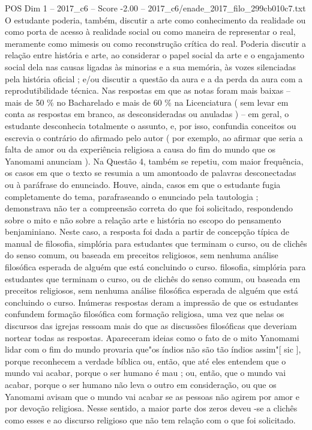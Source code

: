 \begin{textsample}{POS Dim 1 – 2017\_c6 – Score -2.00 – 2017\_c6/enade\_2017\_filo\_299cb010c7.txt}
O estudante poderia, também, discutir a arte como conhecimento da realidade ou como porta de acesso à realidade social ou como maneira de representar o real, meramente como mimesis ou como reconstrução crítica do real.
Poderia discutir a relação entre história e arte, ao considerar o papel social da arte e o engajamento social dela nas causas ligadas às minorias e a sua memória, às vozes silenciadas pela história oficial ; e/ou discutir a questão da aura e a da perda da aura com a reprodutibilidade técnica.
Nas respostas em que as notas foram mais baixas – mais de 50 \% no Bacharelado e mais de 60 \% na Licenciatura ( sem levar em conta as respostas em branco, as desconsideradas ou anuladas ) – em geral, o estudante desconhecia totalmente o assunto, e, por isso, confundia conceitos ou escrevia o contrário do afirmado pelo autor ( por exemplo, ao afirmar que seria a falta de amor ou da experiência religiosa a causa do fim do mundo que os Yanomami anunciam ).
Na Questão 4, também se repetiu, com maior frequência, os casos em que o texto se resumia a um amontoado de palavras desconectadas ou à paráfrase do enunciado.
Houve, ainda, casos em que o estudante fugia completamente do tema, parafraseando o enunciado pela tautologia ; demonstrava não ter a compreensão correta do que foi solicitado, respondendo sobre o mito e não sobre a relação arte e história no escopo do pensamento benjaminiano.
Neste caso, a resposta foi dada a partir de concepção típica de manual de filosofia, simplória para estudantes que terminam o curso, ou de clichês do senso comum, ou baseada em preceitos religiosos, sem nenhuma análise filosófica esperada de alguém que está concluindo o curso. filosofia, simplória para estudantes que terminam o curso, ou de clichês do senso comum, ou baseada em preceitos religiosos, sem nenhuma análise filosófica esperada de alguém que está concluindo o curso.
Inúmeras respostas deram a impressão de que os estudantes confundem formação filosófica com formação religiosa, uma vez que nelas os discursos das igrejas ressoam mais do que as discussões filosóficas que deveriam nortear todas as respostas.
Apareceram ideias como o fato de o mito Yanomami lidar com o fim do mundo provaria que"os índios não são tão índios assim"[ sic ], porque reconhecem a verdade bíblica ou, então, que até eles entendem que o mundo vai acabar, porque o ser humano é mau ; ou, então, que o mundo vai acabar, porque o ser humano não leva o outro em consideração, ou que os Yanomami avisam que o mundo vai acabar se as pessoas não agirem por amor e por devoção religiosa.
Nesse sentido, a maior parte dos zeros deveu -se a clichês como esses e ao discurso religioso que não tem relação com o que foi solicitado.

\end{textsample}
